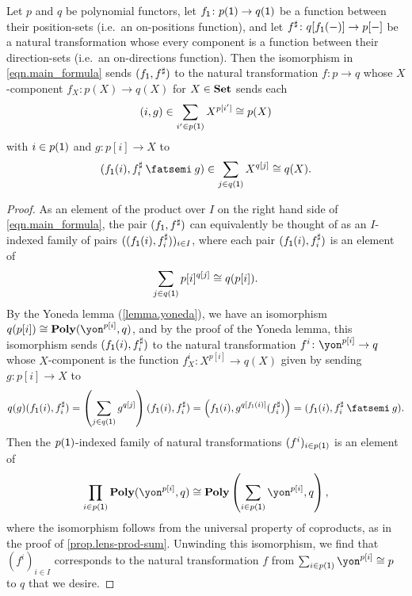 \documentclass[Book-Poly]{subfiles}
\begin{document}
\begin{proposition} \label{prop.morph_arena_to_func}
Let $p$ and $q$ be polynomial functors, let $f_{\textsf{1}}\colon p(\textsf{1})\to q(\textsf{1})$ be a function between their position-sets (i.e.\ an on-positions function), and let $f^\sharp\colon q[f_{\textsf{1}}(-)]\to p[-]$ be a natural transformation whose every component is a function between their direction-sets (i.e.\ an on-directions function).
Then the isomorphism in \eqref{eqn.main_formula} sends $(f_{\textsf{1}}, f^\sharp)$ to the natural transformation $f\colon p \to q$ whose $X$-component $f_X\colon p(X)\to q(X)$ for $X\in\mathbf{Set}$ sends each
\[
    (i,g)\in\sum_{i'\in p(\textsf{1})} X^{p[i']}\cong p(X)
\]
with $i\in p(\textsf{1})$ and $g\colon p[i]\to X$ to
\[
    (f_\1(i),f^\sharp_i\then g)\in\sum_{j\in q(\1)}X^{q[j]}\iso q(X).
\]
\end{proposition}
\begin{proof}
As an element of the product over $I$ on the right hand side of \eqref{eqn.main_formula}, the pair $(f_{\textsf{1}},f^\sharp)$ can equivalently be thought of as an $I$-indexed family of pairs $((f_{\textsf{1}}(i),f^\sharp_i))_{i\in I}$, where each pair $(f_{\textsf{1}}(i),f^\sharp_i)$ is an element of
\[
    \sum_{j\in q(\textsf{1})}p[i]^{q[j]}\cong q(p[i]).
\]
By the Yoneda lemma (\cref{lemma.yoneda}), we have an isomorphism $q(p[i]) \iso \poly(\yon^{p[i]}, q)$, and by the proof of the Yoneda lemma, this isomorphism sends $(f_{\textsf{1}}(i), f^\sharp_i)$ to the natural transformation $f^i \colon \yon^{p[i]} \to q$ whose $X$-component is the function $f^i_X \colon X^{p[i]} \to q(X)$ given by sending $g \colon p[i] \to X$ to
\[
    q(g)(f_\1(i), f^\sharp_i) = \left(\sum_{j \in q(\1)} g^{q[j]}\right)(f_\1(i), f^\sharp_i) = \left(f_\1(i), g^{q[f_\1(i)]}(f^\sharp_i)\right) = (f_\1(i), f^\sharp_i \then g).
\]
Then the $p(\textsf{1})$-indexed family of natural transformations $(f^i)_{i\in p(\textsf{1})}$ is an element of
\[
  \prod_{i\in p(\1)}\poly(\yon^{p[i]}, q)\iso\poly\left(\sum_{i\in p(\1)}\yon^{p[i]},q\right),
\]
where the isomorphism follows from the universal property of coproducts, as in the proof of \cref{prop.lens-prod-sum}.
Unwinding this isomorphism, we find that $(f^i)_{i\in I}$ corresponds to the natural transformation $f$ from $\sum_{i\in p(\1)}\yon^{p[i]}\iso p$ to $q$ that we desire.
\end{proof}
\end{document}
